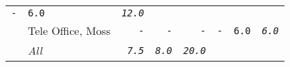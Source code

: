 \documentclass[11pt,A4paper,]{article}
\begin{document}
\begin{longtable}[]{@{}llrrrrrr@{}}
\begin{minipage}[t]{0.12\columnwidth}
\texttt{-}\strut
\end{minipage} & \begin{minipage}[t]{0.12\columnwidth}\raggedleft\strut
\texttt{6.0}\strut
\end{minipage} & \begin{minipage}[t]{0.12\columnwidth}\raggedleft\strut
\emph{\texttt{12.0}}\strut
\end{minipage}\tabularnewline
\begin{minipage}[t]{0.12\columnwidth}\raggedright\strut
\strut
\end{minipage} & \begin{minipage}[t]{0.12\columnwidth}\raggedright\strut
Tele Office, Moss\strut
\end{minipage} & \begin{minipage}[t]{0.12\columnwidth}\raggedleft\strut
\texttt{-}\strut
\end{minipage} & \begin{minipage}[t]{0.12\columnwidth}\raggedleft\strut
\texttt{-}\strut
\end{minipage} & \begin{minipage}[t]{0.12\columnwidth}\raggedleft\strut
\texttt{-}\strut
\end{minipage} & \begin{minipage}[t]{0.12\columnwidth}\raggedleft\strut
\texttt{-}\strut
\end{minipage} & \begin{minipage}[t]{0.12\columnwidth}\raggedleft\strut
\texttt{6.0}\strut
\end{minipage} & \begin{minipage}[t]{0.12\columnwidth}\raggedleft\strut
\emph{\texttt{6.0}}\strut
\end{minipage}\tabularnewline
\begin{minipage}[t]{0.12\columnwidth}\raggedright\strut
\strut
\end{minipage} & \begin{minipage}[t]{0.12\columnwidth}\raggedright\strut
\emph{All}\strut
\end{minipage} & \begin{minipage}[t]{0.12\columnwidth}\raggedleft\strut
\emph{\texttt{7.5}}\strut
\end{minipage} & \begin{minipage}[t]{0.12\columnwidth}\raggedleft\strut
\emph{\texttt{8.0}}\strut
\end{minipage} & \begin{minipage}[t]{0.12\columnwidth}\raggedleft\strut
\emph{\texttt{20.0}}\strut

\end{minipage}
\end{longtable}
\end{document}
